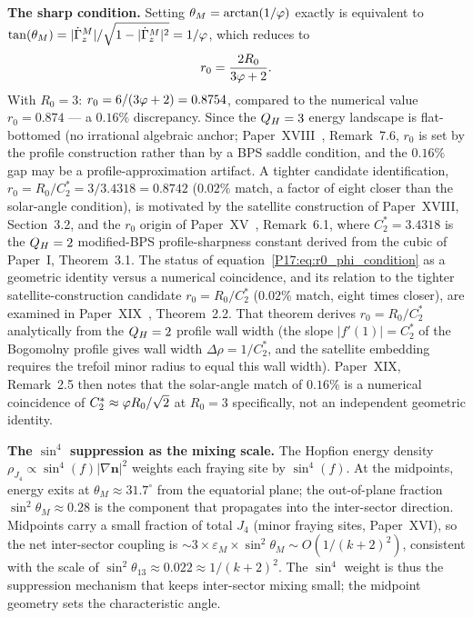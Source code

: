 \begin{remark}
\textbf{The sharp condition.}
Setting $\theta_M = \arctan(1/\varphi)$ exactly is equivalent to
$\tan(\theta_M) = |\dot\Gamma_z^M|/\sqrt{1-|\dot\Gamma_z^M|^2} = 1/\varphi$,
which reduces to
\begin{equation}
  r_0 = \frac{2R_0}{3\varphi+2}.
  \label{P17:eq:r0_phi_condition}
\end{equation}
With $R_0=3$: $r_0=6/(3\varphi+2)=0.8754$, compared to the numerical
value $r_0=0.874$ --- a $0.16\%$ discrepancy.  Since the $Q_H=3$
energy landscape is flat-bottomed (no irrational algebraic anchor;
Paper~XVIII~\cite{Paper18}, Remark~7.6, %
$r_0$ is set by the profile construction rather than by a BPS saddle
condition, and the $0.16\%$ gap may be a profile-approximation
artifact.  A tighter candidate identification,
$r_0=R_0/C_2^*=3/3.4318=0.8742$ ($0.02\%$ match, a factor of eight
closer than the solar-angle condition), is motivated by the satellite
construction of Paper~XVIII, Section~3.2, %
and the $r_0$ origin of Paper~XV~\cite{Paper15}, Remark~6.1, %
where $C_2^*=3.4318$ is the $Q_H=2$ modified-BPS profile-sharpness
constant derived from the cubic of Paper~I, Theorem~3.1.
The status of equation~\eqref{P17:eq:r0_phi_condition} as a geometric identity versus a
numerical coincidence, and its relation to the tighter satellite-construction
candidate $r_0=R_0/C_2^*$ ($0.02\%$ match, eight times closer), are examined
in Paper~XIX~\cite{Paper19}, Theorem~2.2. %
That theorem derives $r_0=R_0/C_2^*$ analytically from the
$Q_H=2$ profile wall width (the slope $|f'(1)|=C_2^*$ of the
Bogomolny profile gives wall width $\Delta\rho=1/C_2^*$, and the
satellite embedding requires the trefoil minor radius to equal this
wall width).  Paper~XIX, Remark~2.5 %
then notes that the solar-angle match of $0.16\%$ is a numerical
coincidence of $C_2^*\approx\varphi R_0/\sqrt{2}$ at $R_0=3$
specifically, not an independent geometric identity.

\textbf{The $\sin^4$ suppression as the mixing scale.}
The Hopfion energy density $\rho_{J_4}\propto\sin^4(f)|\nabla\mathbf{n}|^2$
weights each fraying site by $\sin^4(f)$.  At the midpoints, energy
exits at $\theta_M\approx31.7^\circ$ from the equatorial plane; the
out-of-plane fraction $\sin^2\theta_M\approx0.28$ is the component
that propagates into the inter-sector direction.  Midpoints carry a
small fraction of total $J_4$ (minor fraying sites, Paper~XVI), so the
net inter-sector coupling is $\sim 3\times\varepsilon_M\times
\sin^2\theta_M\sim O(1/(k+2)^2)$, consistent with the scale of
$\sin^2\theta_{13}\approx0.022\approx 1/(k+2)^2$.  The $\sin^4$
weight is thus the suppression mechanism that keeps inter-sector mixing
small; the midpoint geometry sets the characteristic angle.
\end{remark}

